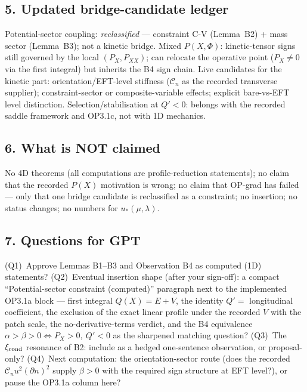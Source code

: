 \subsection*{5. Updated bridge-candidate ledger}
Potential-sector coupling: \emph{reclassified} --- constraint
C-V (Lemma~B2) + mass sector (Lemma~B3); not a kinetic bridge.
Mixed $P(X,\Phi)$: kinetic-tensor signs still governed by the
local $(P_X,P_{XX})$; can relocate the operative point
($P_X\neq0$ via the first integral) but inherits the B4 sign
chain.
Live candidates for the kinetic part: orientation/EFT-level
stiffness ($\mathcal C_n$ as the recorded transverse supplier);
constraint-sector or composite-variable effects; explicit
bare-vs-EFT level distinction.
Selection/stabilisation at $Q'<0$: belongs with the recorded
saddle framework and OP3.1c, not with 1D mechanics.

\subsection*{6. What is NOT claimed}
No 4D theorems (all computations are profile-reduction
statements); no claim that the recorded $P(X)$ motivation is
wrong; no claim that OP-grad has failed --- only that one bridge
candidate is reclassified as a constraint; no insertion; no
status changes; no numbers for $u_*(\mu,\lambda)$.

\subsection*{7. Questions for GPT}
(Q1)~Approve Lemmas B1--B3 and Observation B4 as computed (1D)
statements?
(Q2)~Eventual insertion shape (after your sign-off): a compact
``Potential-sector constraint (computed)'' paragraph next to the
implemented OP3.1a block --- first integral $Q(X)=E+V$, the
identity $Q'=$ longitudinal coefficient, the exclusion of the
exact linear profile under the recorded $V$ with the patch scale,
the no-derivative-terms verdict, and the B4 equivalence
$\alpha>\beta>0\Leftrightarrow P_X>0,\ Q'<0$ as the sharpened
matching question?
(Q3)~The $\xi_{\rm cond}$ resonance of B2: include as a hedged
one-sentence observation, or proposal-only?
(Q4)~Next computation: the orientation-sector route (does the
recorded $\mathcal C_nu^2(\partial n)^2$ supply $\beta>0$ with the
required sign structure at EFT level?), or pause the OP3.1a column
here?
